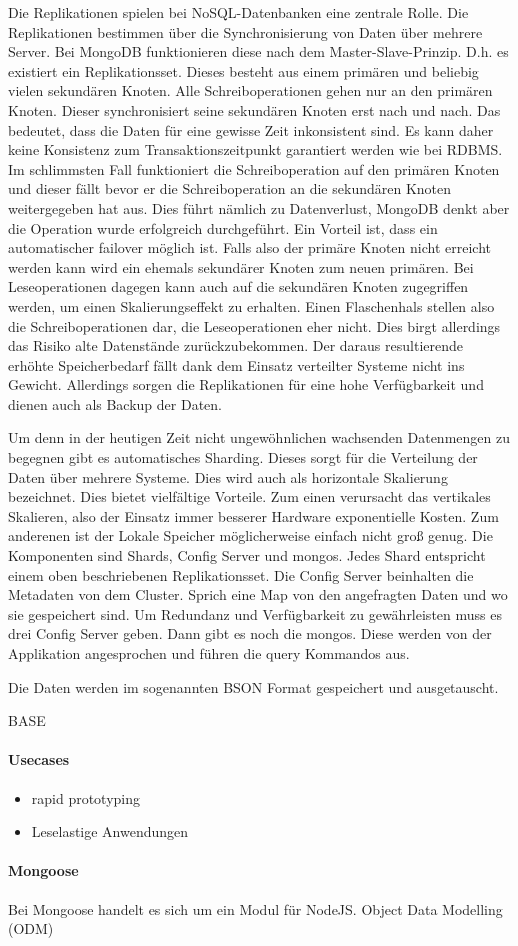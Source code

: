 Die Replikationen spielen bei NoSQL-Datenbanken eine zentrale Rolle. Die
Replikationen bestimmen über die Synchronisierung von Daten über mehrere
Server. Bei MongoDB funktionieren diese nach dem Master-Slave-Prinzip.
D.h. es existiert ein Replikationsset. Dieses besteht aus einem primären
und beliebig vielen sekundären Knoten. Alle Schreiboperationen gehen nur
an den primären Knoten. Dieser synchronisiert seine sekundären Knoten
erst nach und nach. Das bedeutet, dass die Daten für eine gewisse Zeit
inkonsistent sind. Es kann daher keine Konsistenz zum
Transaktionszeitpunkt garantiert werden wie bei RDBMS. Im schlimmsten
Fall funktioniert die Schreiboperation auf den primären Knoten und
dieser fällt bevor er die Schreiboperation an die sekundären Knoten
weitergegeben hat aus. Dies führt nämlich zu Datenverlust, MongoDB denkt
aber die Operation wurde erfolgreich durchgeführt. Ein Vorteil ist, dass
ein automatischer failover möglich ist. Falls also der primäre Knoten
nicht erreicht werden kann wird ein ehemals sekundärer Knoten zum neuen
primären. Bei Leseoperationen dagegen kann auch auf die sekundären
Knoten zugegriffen werden, um einen Skalierungseffekt zu erhalten. Einen
Flaschenhals stellen also die Schreiboperationen dar, die
Leseoperationen eher nicht. Dies birgt allerdings das Risiko alte
Datenstände zurückzubekommen. Der daraus resultierende erhöhte
Speicherbedarf fällt dank dem Einsatz verteilter Systeme nicht ins
Gewicht. Allerdings sorgen die Replikationen für eine hohe Verfügbarkeit
und dienen auch als Backup der Daten.

Um denn in der heutigen Zeit nicht ungewöhnlichen wachsenden Datenmengen
zu begegnen gibt es automatisches Sharding. Dieses sorgt für die
Verteilung der Daten über mehrere Systeme. Dies wird auch als
horizontale Skalierung bezeichnet. Dies bietet vielfältige Vorteile. Zum
einen verursacht das vertikales Skalieren, also der Einsatz immer
besserer Hardware exponentielle Kosten. Zum anderenen ist der Lokale
Speicher möglicherweise einfach nicht groß genug. Die Komponenten sind
Shards, Config Server und mongos. Jedes Shard entspricht einem oben
beschriebenen Replikationsset. Die Config Server beinhalten die
Metadaten von dem Cluster. Sprich eine Map von den angefragten Daten und
wo sie gespeichert sind. Um Redundanz und Verfügbarkeit zu gewährleisten
muss es drei Config Server geben. Dann gibt es noch die mongos. Diese
werden von der Applikation angesprochen und führen die query Kommandos
aus.

Die Daten werden im sogenannten BSON Format gespeichert und
ausgetauscht.

BASE

\paragraph{Usecases}\label{usecases}

\begin{itemize}
\itemsep1pt\parskip0pt
\item
  rapid prototyping
\item
  Leselastige Anwendungen
\end{itemize}

\paragraph{Mongoose}\label{mongoose}

Bei Mongoose handelt es sich um ein Modul für NodeJS. Object Data
Modelling (ODM)

